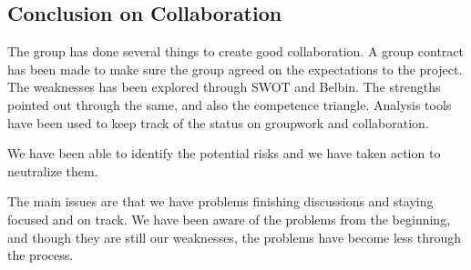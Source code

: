 
\subsection{Conclusion on Collaboration}

The group has done several things to create good collaboration. A group contract has been made to make sure the group agreed on the expectations to the project. The weaknesses has been explored through SWOT and Belbin. The strengths pointed out through the same, and also the competence triangle. Analysis tools have been used to keep track of the status on groupwork and collaboration.

We have been able to identify the potential risks and we have taken action to neutralize them. 

The main issues are that we have problems finishing discussions and staying focused and on track. We have been aware of the problems from the beginning, and though they are still our weaknesses, the problems have become less through the process.

